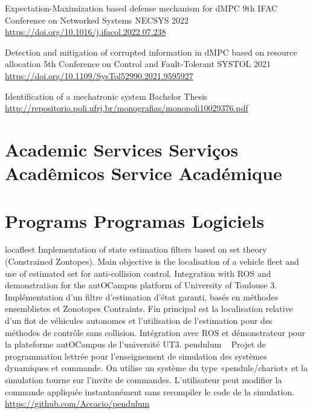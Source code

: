 {Expectation-Maximization based defense mechanism for dMPC}
{}
{}{}{9th IFAC Conference on Networked Systems NECSYS 2022\\\url{https://doi.org/10.1016/j.ifacol.2022.07.238}}

{Detection and mitigation of corrupted information in dMPC based on resource allocation}
{}
{}{}{5th Conference on Control and Fault-Tolerant SYSTOL 2021\\\url{https://doi.org/10.1109/SysTol52990.2021.9595927}}

{Identification of a mechatronic system}
{}
{}{}{Bachelor Thesis\\\url{http://repositorio.poli.ufrj.br/monografias/monopoli10029376.pdf}}

\section{
  \ml
  {Academic Services}
  {Serviços Acadêmicos}
  {Service Académique}
}
\section{
  \ml
  {Programs}
  {Programas}
  {Logiciels}
}
{locafleet}
{}
{}{}{
  \ml
  {Implementation of state estimation filters based on set theory (Constrained Zontopes).
    Main objective is the localisation of a vehicle fleet and use of estimated set for anti-collision control.
    Integration with ROS and demonstration for the \mbox{aut\uppercase{oc}ampus} platform of University of Toulouse 3.
  }
  {}
  {Implémentation d'un filtre d'estimation d'état garanti, basés en méthodes ensemblistes et Zonotopes Contraints.
  Fin principal est la localisation relative d'un flot de véhicules autonomes et l'utilisation de l'estimation pour des méthodes de contrôle sans collision.
  Intégration avec ROS et démonstrateur pour la plateforme autOCampus de l'université UT3.}
}
{pendulum}
{}
{}{}{
  {~
  }
  {Projet de programmation lettrée pour l'enseignement de simulation des systèmes dynamiques et commande. On utilise un système du type «pendule/chariot» et la simulation tourne sur l'invite de commandes. L'utilisateur peut modifier la commande appliquée instantanément sans recompiler le code de la simulation.}
  \\\url{https://github.com/Accacio/pendulum}
}

